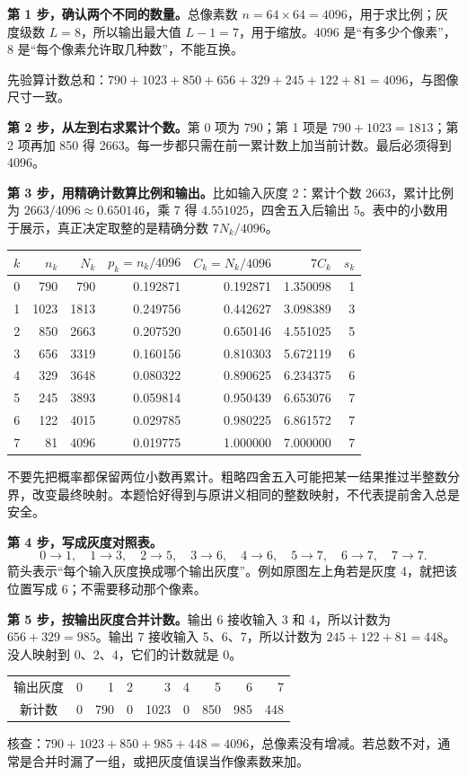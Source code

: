 \textbf{第 1 步，确认两个不同的数量。}总像素数 $n=64\times64=4096$，用于求比例；灰度级数 $L=8$，所以输出最大值 $L-1=7$，用于缩放。4096 是“有多少个像素”，8 是“每个像素允许取几种数”，不能互换。

先验算计数总和：$790+1023+850+656+329+245+122+81=4096$，与图像尺寸一致。

\textbf{第 2 步，从左到右求累计个数。}第 0 项为 790；第 1 项是 $790+1023=1813$；第 2 项再加 850 得 2663。每一步都只需在前一累计数上加当前计数。最后必须得到 4096。

\textbf{第 3 步，用精确计数算比例和输出。}比如输入灰度 2：累计个数 2663，累计比例为 $2663/4096\approx0.650146$，乘 7 得 $4.551025$，四舍五入后输出 5。表中的小数用于展示，真正决定取整的是精确分数 $7N_k/4096$。

\begin{center}
\small
\begin{tabular}{rrrrrrr}
\toprule
$k$ & $n_k$ & $N_k$ & $p_k=n_k/4096$ & $C_k=N_k/4096$ & $7C_k$ & $s_k$\\
\midrule
0&790&790&0.192871&0.192871&1.350098&1\\
1&1023&1813&0.249756&0.442627&3.098389&3\\
2&850&2663&0.207520&0.650146&4.551025&5\\
3&656&3319&0.160156&0.810303&5.672119&6\\
4&329&3648&0.080322&0.890625&6.234375&6\\
5&245&3893&0.059814&0.950439&6.653076&7\\
6&122&4015&0.029785&0.980225&6.861572&7\\
7&81&4096&0.019775&1.000000&7.000000&7\\
\bottomrule
\end{tabular}
\end{center}

不要先把概率都保留两位小数再累计。粗略四舍五入可能把某一结果推过半整数分界，改变最终映射。本题恰好得到与原讲义相同的整数映射，不代表提前舍入总是安全。

\textbf{第 4 步，写成灰度对照表。}
\[
0\to1,\quad 1\to3,\quad 2\to5,\quad
3\to6,\quad 4\to6,\quad
5\to7,\quad 6\to7,\quad 7\to7.
\]
箭头表示“每个输入灰度换成哪个输出灰度”。例如原图左上角若是灰度 4，就把该位置写成 6；不需要移动那个像素。

\textbf{第 5 步，按输出灰度合并计数。}输出 6 接收输入 3 和 4，所以计数为 $656+329=985$。输出 7 接收输入 5、6、7，所以计数为 $245+122+81=448$。没人映射到 0、2、4，它们的计数就是 0。

\begin{center}
\begin{tabular}{c|rrrrrrrr}
\toprule
输出灰度 &0&1&2&3&4&5&6&7\\
新计数 &0&790&0&1023&0&850&985&448\\
\bottomrule
\end{tabular}
\end{center}
核查：$790+1023+850+985+448=4096$，总像素没有增减。若总数不对，通常是合并时漏了一组，或把灰度值误当作像素数来加。

